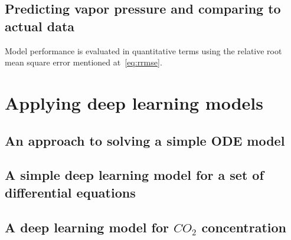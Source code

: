 \documentclass[a4paper]{article}
\begin{document}
\subsection{Predicting vapor pressure and comparing to actual data}
Model performance is evaluated in quantitative terms using the relative root mean square error mentioned at~\eqref{eq:rrmse}.

\newpage
\section{Applying deep learning models}
\subsection{An approach to solving a simple ODE model}

\subsection{A simple deep learning model for a set of differential equations}

\subsection{A deep learning model for \(CO_2\) concentration}

\newpage
\printbibliography[heading=bibintoc]
\end{document}
